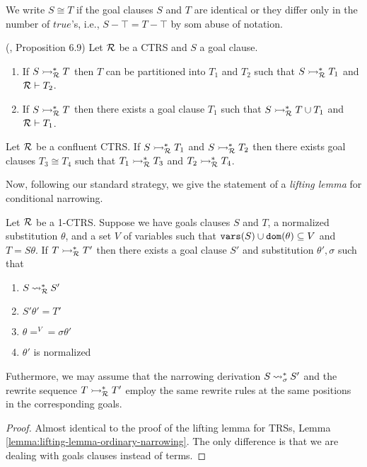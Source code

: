 We write $S \cong T$ if the goal clauses $S$ and $T$ are identical or they differ only in the number of $true$'s, i.e., $S - \top = T - \top$ by som abuse of notation.

\begin{proposition}(\cite{Middeldorp1994}, Proposition 6.9)
    Let $\mathcal{R}$ be a CTRS and $S$ a goal clause.
    \begin{enumerate}
        \item If $S \rightarrowtail^*_{\mathcal{R}} T$ then $T$ can be partitioned into $T_1$ and $T_2$ such that $S \rightarrowtail^*_{\mathcal{R}} T_1$ and $\mathcal{R} \vdash T_2$.
        \item If $S \rightarrowtail^*_{\mathcal{R}} T$ then there exists a goal clause $T_1$ such that $S \rightarrowtail^*_{\mathcal{R}} T \cup T_1$ and $\mathcal{R} \vdash T_1$.
    \end{enumerate}
\end{proposition}

\begin{lemma}
    Let $\mathcal{R}$ be a confluent CTRS. If $S \rightarrowtail^*_{\mathcal{R}} T_1$ and $S \rightarrowtail^*_{\mathcal{R}} T_2$ then there exists goal clauses $T_3 \cong T_4$ such that $T_1 \rightarrowtail^*_{\mathcal{R}} T_3$ and $T_2 \rightarrowtail^*_{\mathcal{R}} T_4$.
\end{lemma}

Now, following our standard strategy, we give the statement of a \textit{lifting lemma} for conditional narrowing.

\begin{lemma}\label{lemma:lifting-lemma-conditional-narrowing}
    Let $\mathcal{R}$ be a 1-CTRS. Suppose we have goals clauses $S$ and $T$, a normalized substitution $\theta$, and a set $V$ of variables such that $\mathtt{vars}(S) \cup \mathtt{dom}(\theta) \subseteq V$ and $T = S \theta$. If $T \rightarrowtail^*_{\mathcal{R}} T'$ then there exists a goal clause $S'$ and substitution $\theta', \sigma$ such that
    \begin{enumerate}
        \item $S \mathbin{\rightsquigarrow}^*_{\mathcal{R}} S'$
        \item $S'\theta' = T'$
        \item $\theta =^V = \sigma\theta'$
        \item $\theta'$ is normalized
    \end{enumerate}
    Futhermore, we may assume that the narrowing derivation $S \mathbin{\rightsquigarrow}^*_\sigma S'$ and the rewrite sequence $T \rightarrowtail^*_{\mathcal{R}} T'$ employ the same rewrite rules at the same positions in the corresponding goals.
    \begin{proof}
        Almost identical to the proof of the lifting lemma for TRSs, Lemma \ref{lemma:lifting-lemma-ordinary-narrowing}. The only difference is that we are dealing with goals clauses instead of terms.
    \end{proof}
\end{lemma}

